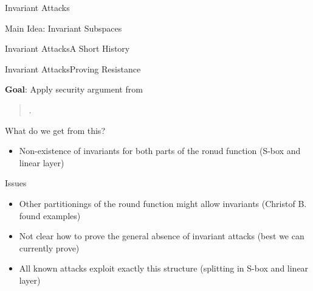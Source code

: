 \begin{frame}{Invariant Attacks}
\begin{block}{Main Idea: Invariant Subspaces}
    \end{block}
\end{frame}

\begin{frame}{Invariant Attacks}{A Short History}
    \begin{timeline}
    \end{timeline}
\end{frame}

\begin{frame}{Invariant Attacks}{Proving Resistance}
    \centering
    \begin{block}{\textbf{Goal}: Apply security argument from}
    \begin{quote}
        .
    \end{quote}
    \end{block}
    \begin{exampleblock}{What do we get from this?}
        \begin{itemize}
            \item Non-existence of invariants for both parts of the ronud function (S-box and linear layer)
        \end{itemize}
    \end{exampleblock}
    \begin{alertblock}{Issues}
    \begin{itemize}
        \item Other partitionings of the round function might allow invariants (Christof B\@. found examples)
        \item Not clear how to prove the general absence of invariant attacks (best we can currently prove)
        \item All known attacks exploit exactly this structure (splitting in S-box and linear layer)
    \end{itemize}
    \end{alertblock}
\end{frame}

